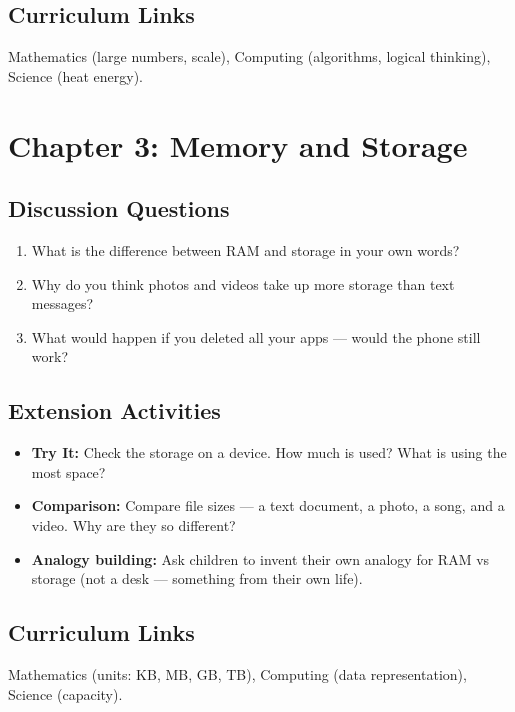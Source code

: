 \subsection*{Curriculum Links}
Mathematics (large numbers, scale), Computing (algorithms, logical thinking), Science (heat energy).

\sectionrule

\section*{Chapter 3: Memory and Storage}

\subsection*{Discussion Questions}
\begin{enumerate}
  \item What is the difference between RAM and storage in your own words?
  \item Why do you think photos and videos take up more storage than text messages?
  \item What would happen if you deleted all your apps — would the phone still work?
\end{enumerate}

\subsection*{Extension Activities}
\begin{itemize}
  \item \textbf{Try It:} Check the storage on a device. How much is used? What is using the most space?
  \item \textbf{Comparison:} Compare file sizes — a text document, a photo, a song, and a video. Why are they so different?
  \item \textbf{Analogy building:} Ask children to invent their own analogy for RAM vs storage (not a desk — something from their own life).
\end{itemize}

\subsection*{Curriculum Links}
Mathematics (units: KB, MB, GB, TB), Computing (data representation), Science (capacity).

